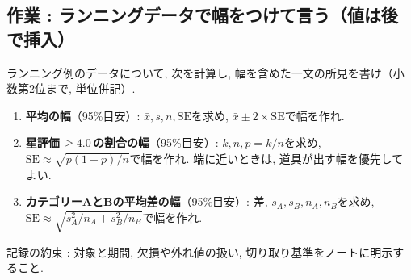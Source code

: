   \subsection*{作業 : ランニングデータで幅をつけて言う（値は後で挿入）}

    ランニング例のデータについて, 次を計算し,
    幅を含めた一文の所見を書け（小数第2位まで, 単位併記）.

    \begin{enumerate}
      \item \textbf{平均の幅}（95\%目安）:
            $\bar{x}, s, n, \mathrm{SE}$を求め,
            $\bar{x} \pm 2 \times \mathrm{SE}$で幅を作れ.
      \item \textbf{星評価\,$\geq 4.0$\,の割合の幅}（95\%目安）:
            $k, n, p = k/n$を求め,
            $\mathrm{SE} \approx \sqrt{p(1-p)/n}$で幅を作れ.
            端に近いときは, 道具が出す幅を優先してよい.
      \item \textbf{カテゴリーAとBの平均差の幅}（95\%目安）:
            差, $s_A, s_B, n_A, n_B$を求め,
            $\mathrm{SE} \approx \sqrt{s_A^2/n_A + s_B^2/n_B}$で幅を作れ.
    \end{enumerate}

    記録の約束 : 対象と期間, 欠損や外れ値の扱い, 切り取り基準をノートに明示すること.
